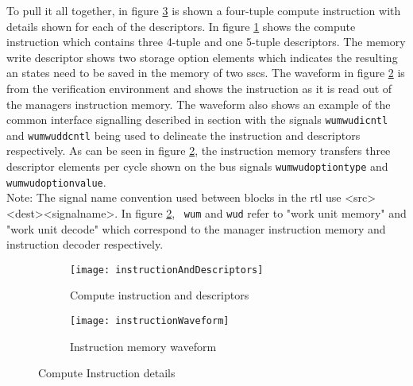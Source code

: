 To pull it all together, in figure \ref{fig:Instruction Details} is shown a four-tuple compute instruction with details shown for each of the descriptors.
In figure \ref{fig:Instruction and Descriptors} shows the compute instruction which contains three 4-tuple and one 5-tuple descriptors.
The memory write descriptor shows two storage option elements which indicates the resulting \ac{an} states need to be saved in the memory of two \acp{ssc}.
The waveform in figure \ref{fig:Instruction memory waveform} is from the verification environment and shows the instruction as it is read out of the managers instruction memory.
The waveform also shows an example of the common interface signalling described in section \label{sec:Common Bus Signalling} with the signals \texttt{wum\textunderscore\textunderscore wud\textunderscore\textunderscore icntl} and \texttt{wum\textunderscore\textunderscore wud\textunderscore\textunderscore dcntl} being used to delineate the instruction and descriptors respectively.
As can be seen in figure \ref{fig:Instruction memory waveform}, the instruction memory transfers three descriptor elements per cycle shown on the bus signals \texttt{wum\textunderscore\textunderscore wud\textunderscore\textunderscore option\textunderscore type} and \texttt{wum\textunderscore\textunderscore wud\textunderscore\textunderscore option\textunderscore value}.
\\
Note: The signal name convention used between blocks in the \ac{rtl} use <src>\textunderscore\textunderscore <dest>\textunderscore\textunderscore <signal\textunderscore\textunderscore  name>. In figure \ref{fig:Instruction memory waveform},~ \texttt{wum} and \texttt{wud} refer to "work unit memory" and "work unit decode"
which correspond to the manager instruction memory and instruction decoder respectively.

\begin{figure}
\centering
  \begin{subfigure}{.95\textwidth}
    \centering
    \mbox{\texttt{[image: instructionAndDescriptors]}}
    \captionsetup{justification=centering, skip=6pt}
    \caption{Compute instruction and descriptors}
    \label{fig:Instruction and Descriptors}
  \end{subfigure}%

\bigskip

  \vspace{-35pt}
  \begin{subfigure}{1\textwidth}
    \centering
    \vspace{40pt}
    \texttt{[image: instructionWaveform]}
    \captionsetup{justification=centering, skip=10pt}
    \caption{Instruction memory waveform}
    \label{fig:Instruction memory waveform}
  \end{subfigure}%
\captionsetup{justification=centering, skip=16pt}
\caption{Compute Instruction details}
\label{fig:Instruction Details}
\end{figure}



